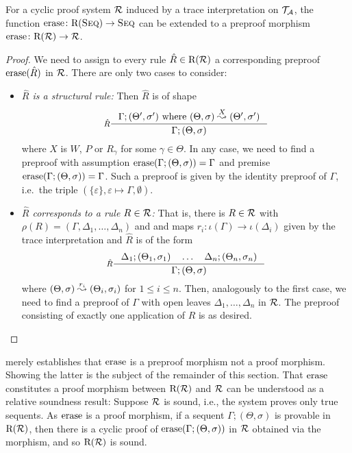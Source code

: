 \begin{lemma}\label{lem:strip-simple-morph}
  For a cyclic proof system $\mathcal{R}$ induced by a trace interpretation on $\mathcal{T}_{\mathcal{A}}$, the
  function $\mathrm{erase} \colon \mathrm{R}(\textsc{Seq}) \to \textsc{Seq}$ can be extended to a preproof morphism
  $\mathrm{erase} \colon \mathrm{R}(\mathcal{R}) \to \mathcal{R}$.
\end{lemma}
\begin{proof}
  We need to assign to every rule $\hat{R} \in \mathrm{R}(\mathcal{R})$ a
  corresponding preproof $\mathrm{erase}(\hat{R})$ in $\mathcal{R}$. There are only two cases to
  consider:
  \begin{itemize}
  \item \emph{$\hat{R}$ is a structural rule:} Then $\hat{R}$ is of shape
    \[
      \inference[$\hat{R}$]{\Gamma ; (\Theta', \sigma') \text{ where } (\Theta, \sigma) \step{X}
        (\Theta', \sigma')}{\Gamma ; (\Theta, \sigma)}
    \]
    where $X$ is $W$, $P$ or $R_\gamma$ for some $\gamma \in \Theta$. In any
    case, we need to find a preproof with assumption $\mathrm{erase}(\Gamma ; (\Theta,
    \sigma)) = \Gamma$ and premise $\mathrm{erase}(\Gamma ; (\Theta, \sigma)) =
    \Gamma$. Such a preproof is given by the identity preproof of $\Gamma$,
    i.e.~the triple $(\{\varepsilon\}, \varepsilon \mapsto \Gamma, \emptyset)$. 
  \item \emph{$\hat{R}$ corresponds to a rule $R \in \mathcal{R}$:} That is, there is $R
    \in \mathcal{R}$ with $\rho(R) = (\Gamma, \Delta_1, \ldots, \Delta_n)$ and and maps
    $r_i \colon \iota(\Gamma) \to \iota(\Delta_i)$ given by the trace interpretation
    and $\hat{R}$ is of the form
    \[
      \inference[$\hat{R}$]{
        \Delta_1 ; (\Theta_1, \sigma_1)  \quad
        \ldots \quad
        \Delta_n ; (\Theta_n, \sigma_n)
      }
      {\Gamma ; (\Theta, \sigma)}
    \]
    where \((\Theta, \sigma) \stackrel{r_i}{\leadsto} (\Theta_i, \sigma_i)\) for $1 \leq i
    \leq n$.
    Then, analogously to the first case, we need to find a preproof of
    $\Gamma$ with open leaves $\Delta_1, \ldots, \Delta_n$ in $\mathcal{R}$. The
    preproof consisting of exactly one application of $R$ is as desired.
  \end{itemize}
\end{proof}

 merely establishes that $\mathrm{erase}$ is a preproof
morphism not a proof morphism. Showing the latter is the subject of the
remainder of this section.
That $\mathrm{erase}$ constitutes a proof morphism between $\mathrm{R}(\mathcal{R})$
and $\mathcal{R}$ can be understood as a relative soundness result: Suppose $\mathcal{R}$ is
sound, i.e., the system proves only true sequents. As $\mathrm{erase}$ is a proof morphism, if a sequent $\Gamma ; (\Theta, \sigma)$ is provable in \( \mathrm{R}(\mathcal{R}) \),
then there is a cyclic proof of $\mathrm{erase}(\Gamma ; (\Theta, \sigma))$ in $\mathcal{R}$ obtained
via the morphism, and so \( \mathrm{R}(\mathcal{R}) \) is sound.

